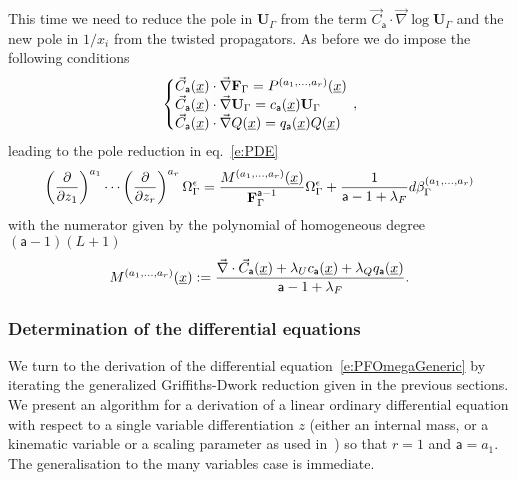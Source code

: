 \documentclass[a4paper,12pt]{article}
\numberwithin{equation}{section}
\numberwithin{figure}{section}
\begin{document}
%
This time we need to reduce the pole in $\mathbf{U}_\Gamma$ from  the term $\vec
    C_{\mathsf{a}}\cdot\vec\nabla\log\mathbf{U}_\Gamma$ and the new
    pole in $1/x_i$ from the twisted propagators.
    As before we do impose the following conditions
\begin{equation}\label{e:sysCFUAnReg}
   \left\{\begin{array}{@{}l@{}}
\vec C_{\mathsf{a}} (\underline x) \cdot \vec \nabla \textbf{F}_\Gamma
            =    P^{(a_1,\dots,a_r)}(\underline x)\\
\vec C_{\mathsf{a}} (\underline x)\cdot\vec \nabla\textbf{U}_\Gamma=
            c_{{\mathsf{a}}}(\underline x) \textbf{U}_\Gamma \\
            \vec C_{\mathsf{a}} (\underline x)\cdot\vec \nabla
            Q(\underline x)=
            q_{{\mathsf{a}}}(\underline x) Q(\underline x)
  \end{array}\right.\,,
\end{equation}
leading to the pole  reduction in eq.~\eqref{e:PDE} 
% 
\begin{equation}\label{e:RedFinalAnReg}
\left(\partial\over \partial z_1\right)^{a_1}\cdots\left(\partial
  \over\partial z_r\right)^{a_r} \Omega_\Gamma^\epsilon={
M^{(a_1,\dots,a_r)}
     (\underline x)
\over \textbf{F}_\Gamma^{\mathsf{a}-1}}\Omega_\Gamma^\epsilon
+{  1\over \mathsf{a}-1+\lambda_F} d\beta_\Gamma^{(a_1,\dots,a_r)}
\end{equation}
with the numerator given by the polynomial of homogeneous degree $(\mathsf{a}-1)(L+1)$
\begin{equation}
  \label{e:MfinalAnReg}
  M^{(a_1,\dots,a_r)}(\underline x):={
\vec\nabla \cdot \vec C_{\mathsf{a}}
     (\underline x)
+  \lambda_U
    c_{\mathsf{a}}(\underline x)+\lambda_Q q_{\mathsf{a}}(\underline x)\over
    \mathsf{a}-1+\lambda_F}.
\end{equation}
%


\subsubsection{Determination of the differential equations}
\label{sec:deriv-diff-equat}


We turn to the derivation of the differential
equation~\eqref{e:PFOmegaGeneric}  by iterating the generalized
Griffiths-Dwork reduction given in the previous sections. We present an algorithm for a derivation of
a linear ordinary differential equation with respect to a single
variable differentiation $z$ (either an internal mass, or a kinematic
variable or a scaling parameter as used
in~\cite{Lairez:2022zkj,Doran:2023yzu}) so that $r=1$ and $\mathsf{a}=a_1$. The generalisation to the
many variables case is immediate.
\end{document}
